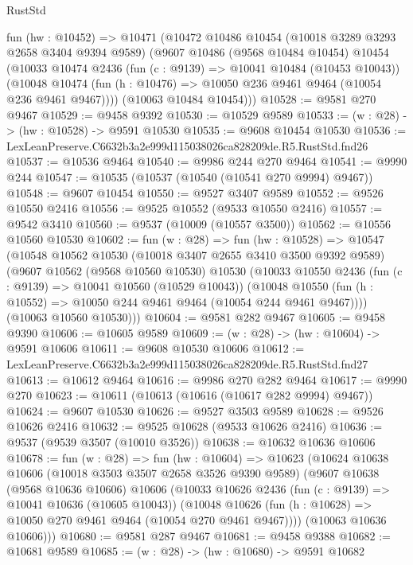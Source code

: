 \begin{lexlean}{RustStd}
\begin{coremodule}
  fun (hw : @10452) =>
  @10471
    (@10472
      @10486
      @10454
      (@10018 @3289 @3293 @2658 @3404 @9394 @9589)
      (@9607
        @10486
        (@9568 @10484 @10454)
        @10454
        (@10033
          @10474
          @2436
          (fun (c : @9139) => @10041 @10484 (@10453 @10043))
          (@10048 @10474 (fun (h : @10476) => @10050 @236 @9461 @9464 (@10054 @236 @9461 @9467))))
        (@10063 @10484 @10454)))
@10528 := @9581 @270 @9467
@10529 := @9458 @9392
@10530 := @10529 @9589
@10533 := (w : @28) -> (hw : @10528) -> @9591 @10530
@10535 := @9608 @10454 @10530
@10536 := LexLeanPreserve.C6632b3a2e999d115038026ca828209de.R5.RustStd.fnd26
@10537 := @10536 @9464
@10540 := @9986 @244 @270 @9464
@10541 := @9990 @244
@10547 := @10535 (@10537 (@10540 (@10541 @270 @9994) @9467))
@10548 := @9607 @10454
@10550 := @9527 @3407 @9589
@10552 := @9526 @10550 @2416
@10556 := @9525 @10552 (@9533 @10550 @2416)
@10557 := @9542 @3410
@10560 := @9537 (@10009 (@10557 @3500))
@10562 := @10556 @10560 @10530
@10602 := fun (w : @28) =>
  fun (hw : @10528) =>
  @10547
    (@10548
      @10562
      @10530
      (@10018 @3407 @2655 @3410 @3500 @9392 @9589)
      (@9607
        @10562
        (@9568 @10560 @10530)
        @10530
        (@10033
          @10550
          @2436
          (fun (c : @9139) => @10041 @10560 (@10529 @10043))
          (@10048 @10550 (fun (h : @10552) => @10050 @244 @9461 @9464 (@10054 @244 @9461 @9467))))
        (@10063 @10560 @10530)))
@10604 := @9581 @282 @9467
@10605 := @9458 @9390
@10606 := @10605 @9589
@10609 := (w : @28) -> (hw : @10604) -> @9591 @10606
@10611 := @9608 @10530 @10606
@10612 := LexLeanPreserve.C6632b3a2e999d115038026ca828209de.R5.RustStd.fnd27
@10613 := @10612 @9464
@10616 := @9986 @270 @282 @9464
@10617 := @9990 @270
@10623 := @10611 (@10613 (@10616 (@10617 @282 @9994) @9467))
@10624 := @9607 @10530
@10626 := @9527 @3503 @9589
@10628 := @9526 @10626 @2416
@10632 := @9525 @10628 (@9533 @10626 @2416)
@10636 := @9537 (@9539 @3507 (@10010 @3526))
@10638 := @10632 @10636 @10606
@10678 := fun (w : @28) =>
  fun (hw : @10604) =>
  @10623
    (@10624
      @10638
      @10606
      (@10018 @3503 @3507 @2658 @3526 @9390 @9589)
      (@9607
        @10638
        (@9568 @10636 @10606)
        @10606
        (@10033
          @10626
          @2436
          (fun (c : @9139) => @10041 @10636 (@10605 @10043))
          (@10048 @10626 (fun (h : @10628) => @10050 @270 @9461 @9464 (@10054 @270 @9461 @9467))))
        (@10063 @10636 @10606)))
@10680 := @9581 @287 @9467
@10681 := @9458 @9388
@10682 := @10681 @9589
@10685 := (w : @28) -> (hw : @10680) -> @9591 @10682

\end{coremodule}
\end{lexlean}
